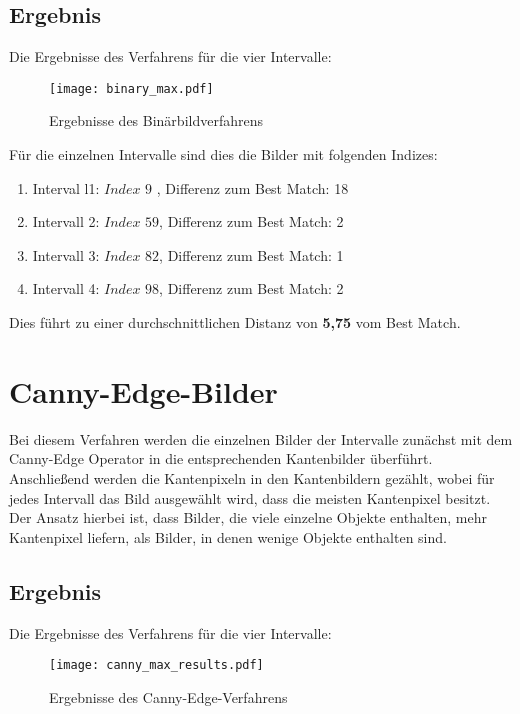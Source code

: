 \subsection{Ergebnis} 

Die Ergebnisse des Verfahrens für die vier Intervalle:
\begin{figure}[H]
  \begin{center}
    \texttt{[image: binary\_max.pdf]}
    \caption{Ergebnisse des Binärbildverfahrens}
    \label{fig:binary_bestmatch4}
  \end{center}
\end{figure}

Für die einzelnen Intervalle  sind dies die Bilder mit folgenden Indizes:
\begin{enumerate}
	\item{Interval l1: $Index$ $9$ , Differenz zum Best Match: 18}
	\item{Intervall 2: $Index$ $59$, Differenz zum Best Match: 2}
	\item{Intervall 3: $Index$ $82$, Differenz zum Best Match: 1 }
	\item{Intervall 4: $Index$ $98$, Differenz zum Best Match: 2}
\end{enumerate}

Dies führt zu einer durchschnittlichen Distanz von \textbf{5,75} vom Best Match.


\section{Canny-Edge-Bilder}
Bei diesem Verfahren werden die einzelnen Bilder der Intervalle zunächst mit dem Canny-Edge Operator in die entsprechenden Kantenbilder überführt. Anschließend werden die Kantenpixeln in den Kantenbildern gezählt, wobei für jedes Intervall das Bild ausgewählt wird, dass die meisten Kantenpixel besitzt.\\

Der Ansatz hierbei ist, dass Bilder, die viele einzelne Objekte enthalten, mehr Kantenpixel liefern, als Bilder, in denen wenige Objekte enthalten sind.

\subsection{Ergebnis} 

Die Ergebnisse des Verfahrens für die vier Intervalle:
\begin{figure}[H]
  \begin{center}
    \texttt{[image: canny\_max\_results.pdf]}
    \caption{Ergebnisse des Canny-Edge-Verfahrens}
    \label{fig:canny_bestmatch4}
  \end{center}
\end{figure}

